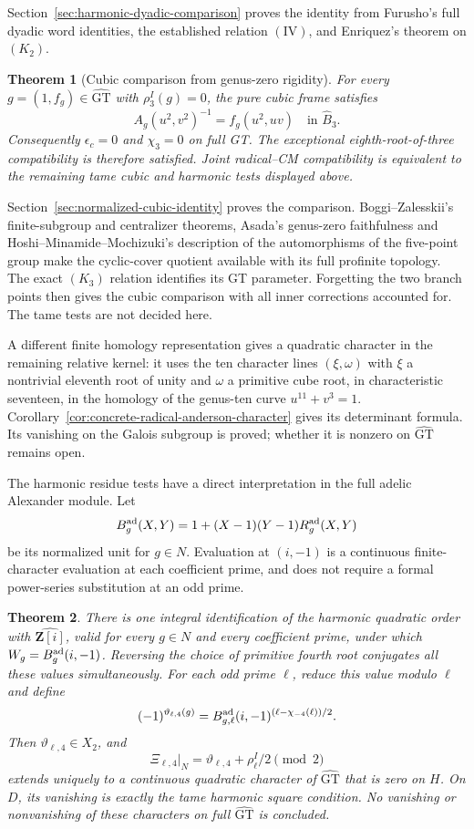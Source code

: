 \documentclass[11pt,a4paper]{article}
\newtheorem{theorem}{Theorem}[section]
\theoremstyle{definition}
\theoremstyle{remark}
\newcommand{\GT}{\widehat{\mathrm{GT}}}
\newcommand{\Z}{\mathbf Z}
\begin{document}
Section~\ref{sec:harmonic-dyadic-comparison} proves the identity
from Furusho's full dyadic word identities, the established
relation $(\mathrm{IV})$, and Enriquez's theorem on $(K_2)$. 

\begin{theorem}[Cubic comparison from genus-zero rigidity]
\label{thm:main-cubic-normalized}
For every $g=(1,f_g)\in\GT$ with $\rho_3^I(g)=0$, the pure
cubic frame satisfies
\[
 A_g(u^2,v^2)^{-1}=f_g(u^2,uv)
 \quad\text{in }\widehat B_3.
\]
Consequently $\epsilon_c=0$ and $\chi_3=0$ on full GT.
The exceptional eighth-root-of-three compatibility is therefore
satisfied. Joint radical--CM compatibility is equivalent to the
remaining tame cubic and harmonic tests displayed above.
\end{theorem}

Section~\ref{sec:normalized-cubic-identity} proves the comparison.
Boggi--Zalesskii's finite-subgroup and centralizer theorems,
Asada's genus-zero faithfulness and
Hoshi--Minamide--Mochizuki's description of the automorphisms
of the five-point group make the cyclic-cover quotient available
with its full profinite topology. The exact $(K_3)$ relation
identifies its GT parameter. Forgetting the two branch points
then gives the cubic comparison with all inner corrections
accounted for. The tame tests are not decided here.

A different finite homology representation gives a quadratic character
in the remaining relative kernel: it uses the ten character lines
$(\xi,\omega)$ with $\xi$ a nontrivial eleventh root of unity and
$\omega$ a primitive cube root, in characteristic seventeen, in the homology of the genus-ten curve
$u^{11}+v^3=1$.
Corollary~\ref{cor:concrete-radical-anderson-character} gives its
determinant formula. Its vanishing on the Galois subgroup is proved;
whether it is nonzero on $\GT$ remains open.

The harmonic residue tests have a direct interpretation in the
full adelic Alexander module. Let
\[
 B_g^{\rm ad}(X,Y)=1+(X-1)(Y-1)R_g^{\rm ad}(X,Y)
\]
be its normalized unit for $g\in N$. Evaluation at $(i,-1)$
is a continuous finite-character evaluation at each coefficient
prime, and does not require a formal power-series substitution
at an odd prime.

\begin{theorem}\label{thm:main-harmonic-beta-residue}
There is one integral identification of the harmonic quadratic order
with $\widehat{\Z[i]}$, valid for every $g\in N$ and every coefficient
prime, under which $W_g=B_g^{\rm ad}(i,-1)$. Reversing the choice of
primitive fourth root conjugates all these values simultaneously.
For each odd prime $\ell$, reduce this value
modulo $\ell$ and define
\[
 (-1)^{\vartheta_{\ell,4}(g)}
   =B_{g,\ell}^{\rm ad}(i,-1)^{(\ell-\chi_{-4}(\ell))/2}.
\]
Then $\vartheta_{\ell,4}\in X_2$, and
\[
 \Xi_{\ell,4}|_N=\vartheta_{\ell,4}+\rho_\ell^I/2\pmod2
\]
extends uniquely to a continuous quadratic character of $\GT$
that is zero on $H$. On $D$, its vanishing is exactly the tame
harmonic square condition. No vanishing or nonvanishing of these
characters on full $\GT$ is concluded.
\end{theorem}
\end{document}

